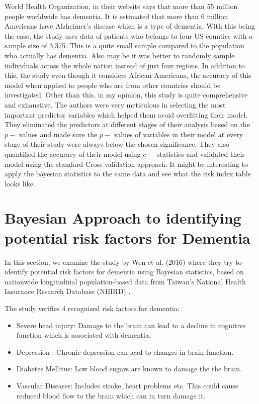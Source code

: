 \documentclass[12pt,letterpaper]{article}
\begin{document}
World Health Organization, in their website says that more than 55 million people worldwide has dementia. It is estimated that more than 6 million Americans have Alzheimer's disease which is a type of dementia. With this being the case, the study uses data of patients who belongs to four US counties with a sample size of 3,375. This is a quite small sample compared to the population who actually has dementia. Also may be it was better to randomly sample individuals across the whole nation instead of just four regions. In addition to this, the study even though it considers African Americans, the accuracy of this model when applied to people who are from other countries should be investigated.  Other than this, in my opinion, this study is quite comprehensive and exhaustive. The authors were very meticulous in selecting the most important predictor variables which helped them avoid overfitting their model. They eliminated the predictors at different stages of their analysis based on the $p-$ values and made sure the $p-$ values of variables in their model at every stage of their study were always below the chosen significance. They also quantified the accuracy of their model using $c-$ statistics and validated their model using the standard Cross validation approach. It might be interesting to apply the bayesian statistics to the same data and see what the risk index table looks like.


\section{Bayesian Approach to identifying potential risk factors for Dementia} 

In this section, we examine the study by Wen et al. (2016) \cite{Wen} where they try to identify potential risk factors for dementia using Bayesian statistics, based on nationwide longitudinal population-based data from Taiwan's National Health Insurance Research Database (NHIRD) \cite{taiwan}.

The study verifies 4 recognized risk factors for dementia:
\begin{itemize}
\item Severe head injury: Damage to the brain can lead to a decline in cognitive function which is associated with dementia.
\item Depression : Chronic depression can lead to changes in brain function.
\item Diabetes Mellitus: Low blood sugars are known to damage the the brain.
\item Vascular Diseases: Includes stroke, heart problems etc. This could cause reduced blood flow to the brain which can in turn damage it.
\end{itemize}
\end{document}
